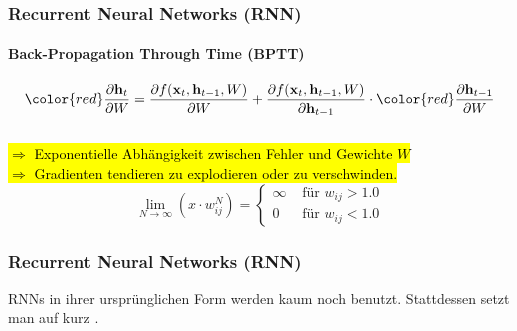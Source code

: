 \documentclass[german,aspectratio=169]{beamer}
\begin{document}
\begin{frame}
	\frametitle{Recurrent Neural Networks (RNN)}
	\framesubtitle{Back-Propagation Through Time (BPTT)}
	\begin{equation*}
		{\color{red}\frac{\partial \mathbf{h}_t}{\partial W}} = \frac{\partial f(\mathbf{x}_t, \mathbf{h}_{t-1}, W)}{\partial W} +  \frac{\partial f(\mathbf{x}_t, \mathbf{h}_{t-1}, W)}{\partial \mathbf{h}_{t-1}} \cdot {\color{red}\frac{\partial \mathbf{h}_{t-1}}{\partial W}}
	\end{equation*}\\
	\vspace{1cm}
	\hl{$\Rightarrow$ Exponentielle Abhängigkeit zwischen Fehler und Gewichte $W$}\\
	\vspace{0.5cm}
	\hl{$\Rightarrow$ Gradienten tendieren zu explodieren oder zu verschwinden.}
	\begin{equation*}
		\lim\limits_{N \rightarrow \infty}(x \cdot w_{ij}^N) = 
		\begin{cases}
			\infty & \text{ für } w_{ij} > 1.0 \\
			0 & \text{ für } w_{ij} < 1.0
		\end{cases} 
	\end{equation*}
	
\end{frame}

\begin{frame}
	\frametitle{Recurrent Neural Networks (RNN)}
	RNNs in ihrer ursprünglichen Form werden kaum noch benutzt. Stattdessen setzt man auf  kurz .
\end{frame}
\end{document}
